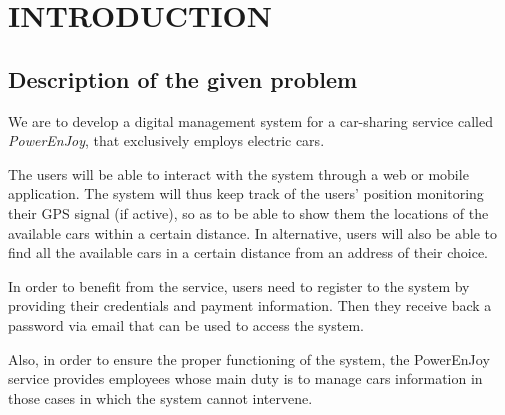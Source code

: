 \section{INTRODUCTION}
\subsection{Description of the given problem}
We are to develop a digital management system for a car-sharing service called \textsl{PowerEnJoy}, that exclusively employs electric cars. 

The users will be able to interact with the system through a web or mobile application. The system will thus keep track of the users' position monitoring their GPS signal (if active), so as to be able to show them the locations of the available cars within a certain distance. In alternative, users will also be able to find all the available cars in a certain distance from an address of their choice.

In order to benefit from the service, users need to register to the system by providing their credentials and payment information. Then they receive back a password via email that can be used to access the system. 

Also, in order to ensure the proper functioning of the system, the PowerEnJoy service provides employees whose main duty is to manage cars information in those cases in which the system cannot intervene.

\newpage
